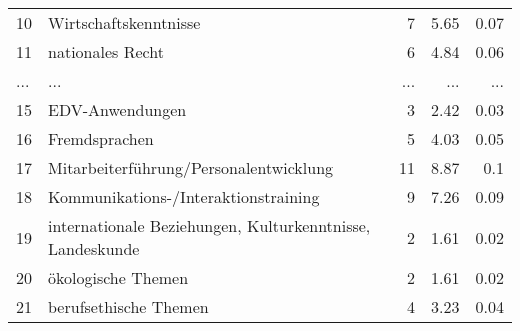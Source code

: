 \begin{longtable}{lXrrr}
        10 & \multicolumn{1}{X}{Wirtschaftskenntnisse} & %
          \num{7} &
          \num[round-mode=places,round-precision=2]{5.65} &
          \num[round-mode=places,round-precision=2]{0.07} \\
        11 & \multicolumn{1}{X}{nationales Recht} & %
          \num{6} &
          \num[round-mode=places,round-precision=2]{4.84} &
          \num[round-mode=places,round-precision=2]{0.06} \\
       ... & ... & ... & ... & ... \\
        15 & \multicolumn{1}{X}{EDV-Anwendungen} & %
          \num{3} &
          \num[round-mode=places,round-precision=2]{2.42} &
          \num[round-mode=places,round-precision=2]{0.03} \\

        16 & \multicolumn{1}{X}{Fremdsprachen} & %
          \num{5} &
          \num[round-mode=places,round-precision=2]{4.03} &
          \num[round-mode=places,round-precision=2]{0.05} \\

        17 & \multicolumn{1}{X}{Mitarbeiterführung/Personalentwicklung} & %
          \num{11} &
          \num[round-mode=places,round-precision=2]{8.87} &
          \num[round-mode=places,round-precision=2]{0.1} \\

        18 & \multicolumn{1}{X}{Kommunikations-/Interaktionstraining} & %
          \num{9} &
          \num[round-mode=places,round-precision=2]{7.26} &
          \num[round-mode=places,round-precision=2]{0.09} \\

        19 & \multicolumn{1}{X}{internationale Beziehungen, Kulturkenntnisse, Landeskunde} & %
          \num{2} &
          \num[round-mode=places,round-precision=2]{1.61} &
          \num[round-mode=places,round-precision=2]{0.02} \\

        20 & \multicolumn{1}{X}{ökologische Themen} & %
          \num{2} &
          \num[round-mode=places,round-precision=2]{1.61} &
          \num[round-mode=places,round-precision=2]{0.02} \\

        21 & \multicolumn{1}{X}{berufsethische Themen} & %
          \num{4} &
          \num[round-mode=places,round-precision=2]{3.23} &
          \num[round-mode=places,round-precision=2]{0.04} \\


\end{longtable}
